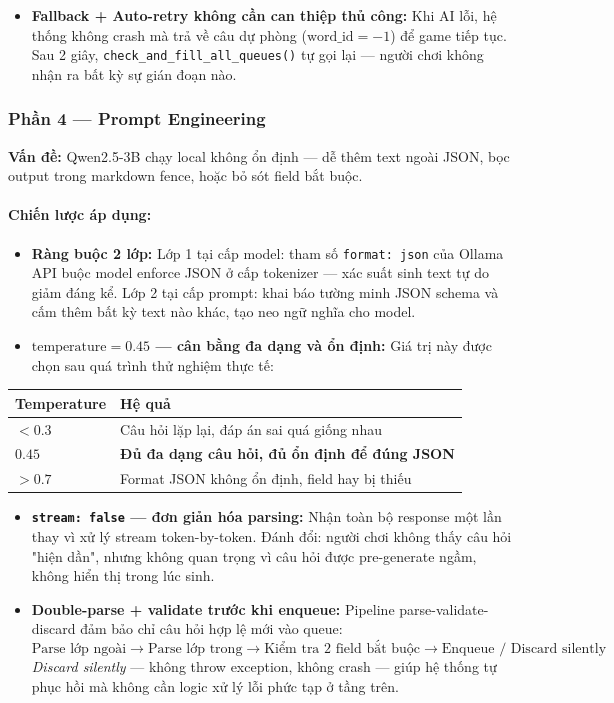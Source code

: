 \begin{itemize}
    \item \textbf{Fallback + Auto-retry không cần can thiệp thủ công:} Khi AI lỗi, hệ thống không crash mà trả về câu dự phòng ($\text{word\_id} = -1$) để game tiếp tục. Sau 2 giây, \texttt{check\_and\_fill\_all\_queues()} tự gọi lại — người chơi không nhận ra bất kỳ sự gián đoạn nào.
\end{itemize}

\subsubsection{Phần 4 — Prompt Engineering}
\textbf{Vấn đề:} Qwen2.5-3B chạy local không ổn định — dễ thêm text ngoài JSON, bọc output trong markdown fence, hoặc bỏ sót field bắt buộc.

\paragraph{Chiến lược áp dụng:}
\begin{itemize}
    \item \textbf{Ràng buộc 2 lớp:} Lớp 1 tại cấp model: tham số \texttt{format: json} của Ollama API buộc model enforce JSON ở cấp tokenizer — xác suất sinh text tự do giảm đáng kể. Lớp 2 tại cấp prompt: khai báo tường minh JSON schema và cấm thêm bất kỳ text nào khác, tạo neo ngữ nghĩa cho model.
    \item \textbf{$\text{temperature} = 0.45$ — cân bằng đa dạng và ổn định:} Giá trị này được chọn sau quá trình thử nghiệm thực tế:
\end{itemize}
\begin{table}[h!]
\centering
\small
\begin{tabularx}{\textwidth}{|l |X|}
\toprule
\textbf{Temperature} & \textbf{Hệ quả} \\
\midrule
$< 0.3$ & Câu hỏi lặp lại, đáp án sai quá giống nhau \\
$\mathbf{0.45}$ & \textbf{Đủ đa dạng câu hỏi, đủ ổn định để đúng JSON} \\
$> 0.7$ & Format JSON không ổn định, field hay bị thiếu \\
\bottomrule
\end{tabularx}
\end{table}

\begin{itemize}
    \item \textbf{\texttt{stream: false} — đơn giản hóa parsing:} Nhận toàn bộ response một lần thay vì xử lý stream token-by-token. Đánh đổi: người chơi không thấy câu hỏi "hiện dần", nhưng không quan trọng vì câu hỏi được pre-generate ngầm, không hiển thị trong lúc sinh.
    \item \textbf{Double-parse + validate trước khi enqueue:} Pipeline parse-validate-discard đảm bảo chỉ câu hỏi hợp lệ mới vào queue:
    \[
    \text{Parse lớp ngoài} \rightarrow \text{Parse lớp trong} \rightarrow \text{Kiểm tra 2 field bắt buộc} \rightarrow \text{Enqueue / Discard silently}
    \]
    \textit{Discard silently} — không throw exception, không crash — giúp hệ thống tự phục hồi mà không cần logic xử lý lỗi phức tạp ở tầng trên.
\end{itemize}


